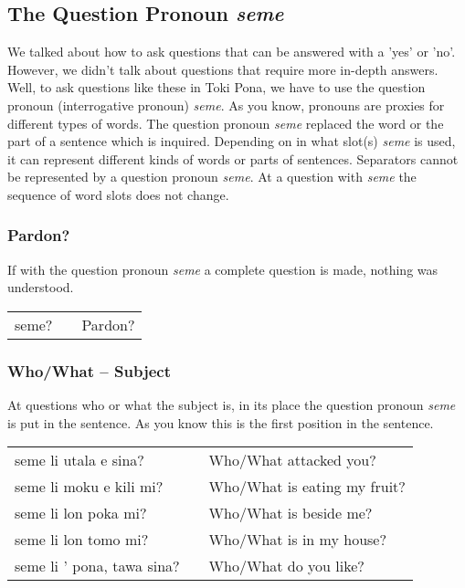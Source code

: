 \subsection*{The Question Pronoun \textit{seme}}
%
%
We talked about how to ask questions that can be answered with a 'yes' or 'no'. 
However, we didn't talk about questions that require more in-depth answers. 
Well, to ask questions like these in Toki Pona, we have to use the question pronoun (interrogative pronoun) \textit{seme}. 
As you know, pronouns are proxies for different types of words.
The question pronoun \textit{seme} replaced the word or the part of a sentence which is inquired.
Depending on in what slot(s) \textit{seme} is used, it can represent different kinds of words or parts of sentences. 
Separators cannot be represented by a question pronoun \textit{seme}. 
At a question with \textit{seme} the sequence of word slots does not change. 
%
\subsubsection*{Pardon?}
%
%
If with the question pronoun \textit{seme} a complete question is made, nothing was understood. 

\begin{supertabular}{p{5,5cm}|ll}
seme? && Pardon? \\
\end{supertabular} 
%
\subsubsection*{Who/What -- Subject}
%
At questions who or what the subject is, in its place the question pronoun \textit{seme} is put in the sentence.
As you know this is the first position in the sentence. 

\begin{supertabular}{p{5,5cm}|ll}
seme li utala e sina? && Who/What attacked you? \\
seme li moku e kili mi? && Who/What is eating my fruit? \\
seme li lon poka mi? && Who/What is beside me? \\
seme li lon tomo mi? && Who/What is in my house? \\
seme li ' pona, tawa sina? && Who/What do you like? \\ 
\end{supertabular} 
%
